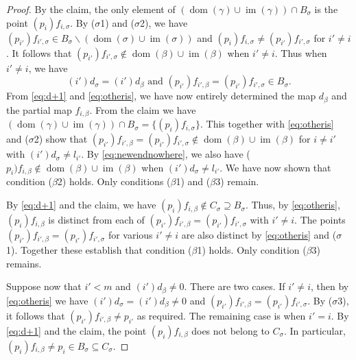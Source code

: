 \documentclass[11pt]{amsart}
\newcommand{\im}{\operatorname{im}}
\newcommand{\dom}{\operatorname{dom}}
\begin{document}
\begin{proof}
     By the claim, the only element of \((\dom(\gamma)\cup \im(\gamma))\cap B_\sigma \) is the point \((p_i)f_{i,\sigma}\).
     By ($\sigma$1) and ($\sigma$2), we have \((p_{i'})f_{i',\sigma}\in B_\sigma\backslash (\dom(\sigma)\cup \im(\sigma))\) and \((p_i)f_{i,\sigma}\neq (p_{i'})f_{i',\sigma}\) for \(i'\neq i\).
     It follows that \((p_{i'})f_{i',\sigma}\not\in \dom(\beta)\cup \im(\beta)\) when \(i'\neq i\). Thus when \(i'\neq i\), we have 
     \begin{equation}\tag{$***$}\label{eq:otheris}
     (i')d_\sigma =(i')d_\beta\text{ and }(p_{i'})f_{i',\beta}=(p_{i'})f_{i',\sigma}\in B_{\sigma}.
     \end{equation}
     From \cref{eq:d+1} and \cref{eq:otheris}, we have now entirely determined the map \(d_{\beta}\) and the partial map \(f_{i,\beta}\).
     From the claim we have \((\dom(\gamma)\cup \im(\gamma))\cap B_{\sigma}=\{(p_i)f_{i,\sigma}\}\). This together with \cref{eq:otheris} and ($\sigma$2) show that \((p_{i'})f_{i',\beta}=(p_{i'})f_{i',\sigma}\notin \dom(\beta)\cup \im(\beta)\) for \(i\neq i'\) with \((i')d_\sigma\neq l_{i'}\).
     By \cref{eq:newendnowhere}, we also have (\(p_{i})f_{i,\beta}\notin \dom(\beta)\cup \im(\beta)\) when \((i')d_\sigma\neq l_{i'}\). We have now shown that condition ($\beta$2) holds. 
     Only conditions ($\beta$1) and ($\beta$3) remain.
     
      By \cref{eq:d+1} and the claim, we have \((p_i)f_{i,\beta}\notin C_\sigma\supseteq B_\sigma\). Thus, by \cref{eq:otheris}, \((p_i)f_{i,\beta}\) is distinct from each of \((p_{i'})f_{i',\beta}=(p_{i'})f_{i',\sigma}\) with \(i'\neq i\). The points \((p_{i'})f_{i',\beta}=(p_{i'})f_{i',\sigma}\) for various \(i'\neq i\) are also distinct by \cref{eq:otheris} and ($\sigma$1). Together these establish that condition ($\beta$1) holds. Only condition ($\beta$3) remains.

     Suppose now that \(i'<m\) and \((i')d_\beta \neq 0\).
     There are two cases. If \(i'\neq i\), then by \cref{eq:otheris} we have \((i')d_\sigma=(i')d_\beta \neq 0\) and \((p_{i'})f_{i',\beta}=(p_{i'})f_{i',\sigma}\).
     By ($\sigma$3), it follows that  \((p_{i'})f_{i',\beta}\neq p_{i'}\) as required.
     The remaining case is when \(i'=i\). By \cref{eq:d+1} and the claim,
     the point \((p_i)f_{i,\beta}\) does not belong to \(C_\sigma\).
     In particular, \((p_i)f_{i,\beta}\neq p_i\in B_\sigma\subseteq C_\sigma\).
     
\end{proof}
\end{document}
